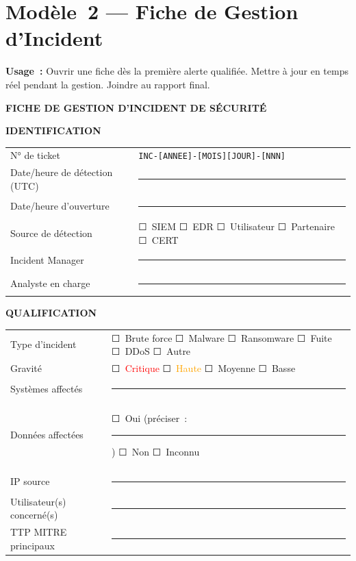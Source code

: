 \clearpage

\section{Modèle~2 — Fiche de Gestion d'Incident}
\label{ann:tpl-incident}

\begin{boxinfo}
\textbf{Usage~:} Ouvrir une fiche dès la première alerte qualifiée.
Mettre à jour en temps réel pendant la gestion. Joindre au rapport final.
\end{boxinfo}

\medskip
\begin{center}
{\large\bfseries\color{CouleurPrimaire}
FICHE DE GESTION D'INCIDENT DE SÉCURITÉ}
\end{center}

\textbf{IDENTIFICATION}

\begin{table}[H]\centering\small{}
\begin{tabular}{p{5cm}p{8.5cm}}
\toprule
N° de ticket & \texttt{INC-[ANNEE]-[MOIS][JOUR]-[NNN]} \\
Date/heure de détection (UTC) & \rule{8.5cm}{0.4pt} \\
Date/heure d'ouverture & \rule{8.5cm}{0.4pt} \\
Source de détection & ☐~SIEM \quad ☐~EDR \quad ☐~Utilisateur \quad ☐~Partenaire \quad ☐~CERT \\
Incident Manager & \rule{8.5cm}{0.4pt} \\
Analyste en charge & \rule{8.5cm}{0.4pt} \\
\bottomrule
\end{tabular}
\end{table}

\textbf{QUALIFICATION}

\begin{table}[H]\centering\small{}
\begin{tabular}{p{5cm}p{8.5cm}}
\toprule
Type d'incident & ☐~Brute force \quad ☐~Malware \quad ☐~Ransomware \quad ☐~Fuite \quad ☐~DDoS \quad ☐~Autre \\
Gravité & ☐~\textcolor{red}{Critique} \quad ☐~\textcolor{orange}{Haute} \quad ☐~\textcolor{yellow!60!black}{Moyenne} \quad ☐~\textcolor{green!50!black}{Basse} \\
Systèmes affectés & \rule{8.5cm}{0.4pt} \\
Données affectées & ☐~Oui (préciser~: \rule{4.5cm}{0.4pt}) \quad ☐~Non \quad ☐~Inconnu \\
IP source & \rule{8.5cm}{0.4pt} \\
Utilisateur(s) concerné(s) & \rule{8.5cm}{0.4pt} \\
TTP MITRE principaux & \rule{8.5cm}{0.4pt} \\
\bottomrule
\end{tabular}
\end{table}

